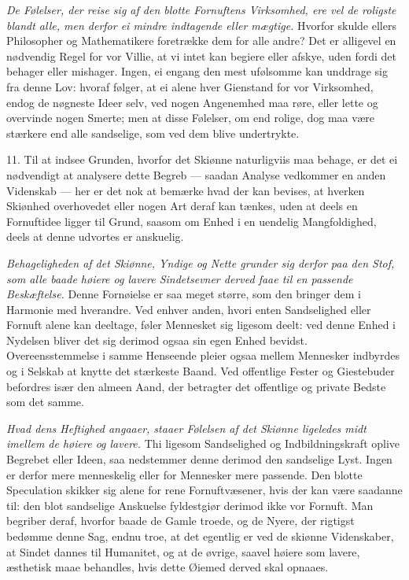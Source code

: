 \documentclass[12pt,a4paper]{article}
\newcommand{\opage}[1]{\marginnote{\footnotesize\textit{[#1]}}}
\begin{document}
\emph{De Følelser, der reise sig af den blotte Fornuftens Virksomhed, ere vel de roligste
blandt alle, men derfor ei mindre indtagende eller mægtige.} Hvorfor skulde ellers
Philosopher og Mathematikere foretrække dem for alle andre? Det er alligevel en nødvendig
Regel for vor Villie, at vi intet kan begiere eller afskye, uden fordi det behager eller
mishager. Ingen, ei engang den mest ufølsomme kan unddrage sig fra denne Lov: hvoraf
følger, at ei alene hver Gienstand for vor Virksomhed, endog de nøgneste Ideer selv, ved
nogen Angenemhed maa røre, eller lette og overvinde nogen Smerte; men at disse Følelser,
om end rolige, dog maa være stærkere end alle sandselige, som ved dem blive undertrykte.

11. Til at indsee Grunden, hvorfor det Skiønne naturligviis maa behage, er det ei
nødvendigt at analysere dette Begreb --- saadan Analyse vedkommer en anden Videnskab ---
her er det nok at bemærke hvad der kan bevises, at hverken Skiønhed overhovedet eller nogen
Art deraf kan tænkes, uden at deels en Fornuftidee ligger til Grund, saasom om Enhed i en
uendelig Mangfoldighed, deels at denne udvortes er anskuelig.

\opage{252} \emph{Behageligheden af det Skiønne, Yndige og Nette grunder sig derfor paa den Stof, som
alle baade høiere og lavere Sindetsevner derved faae til en passende Beskæftelse.} Denne
Fornøielse er saa meget større, som den bringer dem i Harmonie med hverandre. Ved enhver
anden, hvori enten Sandselighed eller Fornuft alene kan deeltage, føler Mennesket sig
ligesom deelt: ved denne Enhed i Nydelsen bliver det sig derimod ogsaa sin egen Enhed
bevidst. Overeensstemmelse i samme Henseende pleier ogsaa mellem Mennesker indbyrdes og i
Selskab at knytte det stærkeste Baand. Ved offentlige Fester og Giestebuder befordres især
den almeen Aand, der betragter det offentlige og private Bedste som det samme.

\emph{Hvad dens Heftighed angaaer, staaer Følelsen af det Skiønne ligeledes midt imellem de
høiere og lavere.} Thi ligesom Sandselighed og Indbildningskraft oplive Begrebet eller
Ideen, saa nedstemmer denne derimod den sandselige Lyst. Ingen er derfor mere menneskelig
eller for Mennesker mere passende. Den blotte Speculation skikker sig alene for rene
Fornuftvæsener, hvis der kan være saadanne til: den blot sandselige Anskuelse fyldestgiør
derimod ikke vor Fornuft. Man begriber deraf, hvorfor baade de Gamle troede, og de Nyere,
der rigtigst bedømme denne Sag, endnu troe, at det egentlig er ved de skiønne Videnskaber,
at Sindet dannes til
\opage{253} Humanitet, og at de øvrige, saavel høiere som lavere, æsthetisk maae behandles, hvis dette
Øiemed derved skal opnaaes.
\end{document}
